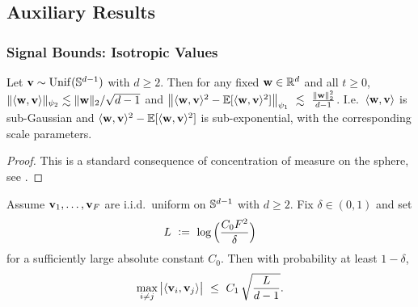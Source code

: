 

\subsection{Auxiliary Results}


\subsubsection{Signal Bounds: Isotropic Values}
\label{app:max-pairwise-ip-values}

\begin{lemma}
\label{lem:iso-innerprod}
Let ${\mathbf{v}}\sim\mathrm{Unif}(\mathbb{S}^{d-1})$ with $d\ge 2$.
Then for any fixed ${\mathbf{w}}\in\mathbb{R}^d$ and all $t\ge 0$,
$\|\langle {{\mathbf{w}}}, {{\mathbf{v}}} \rangle\|_{\psi_2}\lesssim \|{\mathbf{w}}\|_{2}/\sqrt{d-1}$ and
$\big\|\ip{\vw}{\vv}^2-\E[\ip{\vw}{\vv}^2]\big\|_{\psi_1}\ \lesssim\ \frac{\norm{\vw}_{2}^2}{d-1}$. I.e.\ $\langle {{\mathbf{w}}}, {{\mathbf{v}}} \rangle$ is sub-Gaussian and $\langle {{\mathbf{w}}}, {{\mathbf{v}}} \rangle^2-\mathbb{E}[\langle {{\mathbf{w}}}, {{\mathbf{v}}} \rangle^2]$ is sub-exponential, with the corresponding scale parameters.
\end{lemma}
\begin{proof}
    This is a standard consequence of concentration of measure on the sphere, see \cite{vershynin2026high}.
\end{proof}


\begin{lemma}
\label{lem:max-pairwise-ip-values}
Assume ${\mathbf{v}}_{1},\dots,{\mathbf{v}}_{F}$ are i.i.d.\ uniform on $\mathbb{S}^{d-1}$ with $d\ge 2$.
Fix $\delta\in(0,1)$ and set
\begin{equation}
L\ \vcentcolon=\ \log\Big(\frac{C_{0} F^2}{\delta}\Big)
\label{eq:L-signal-values}
\end{equation}
for a sufficiently large absolute constant $C_{0}$.
Then with probability at least $1-\delta$,
\begin{equation}
\max_{i\neq j}\big|\langle {{\mathbf{v}}_i}, {{\mathbf{v}}_j} \rangle\big|
\ \le\
C_{1}\,\sqrt{\frac{L}{d-1}}.
\label{eq:maxpair-ip-values}
\end{equation}
\end{lemma}

